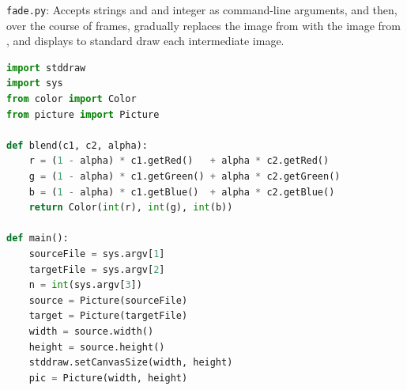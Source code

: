 \documentclass[8pt,a4paper,compress,handout]{beamer}
\begin{document}
\begin{frame}[fragile]
\begin{framed}
\tiny \lstinline{fade.py}: Accepts strings  and  and integer  as command-line arguments, and then, over the course of  frames, gradually replaces the image from  with the image from , and displays to standard draw each intermediate image. 
\end{framed}

\begin{lstlisting}[language=Python]
import stddraw
import sys
from color import Color
from picture import Picture

def blend(c1, c2, alpha):
    r = (1 - alpha) * c1.getRed()   + alpha * c2.getRed()
    g = (1 - alpha) * c1.getGreen() + alpha * c2.getGreen()
    b = (1 - alpha) * c1.getBlue()  + alpha * c2.getBlue()
    return Color(int(r), int(g), int(b))

def main():
    sourceFile = sys.argv[1]
    targetFile = sys.argv[2]
    n = int(sys.argv[3])
    source = Picture(sourceFile)
    target = Picture(targetFile)
    width = source.width()
    height = source.height()
    stddraw.setCanvasSize(width, height)
    pic = Picture(width, height)
\end{lstlisting}
\end{frame}
\end{document}
